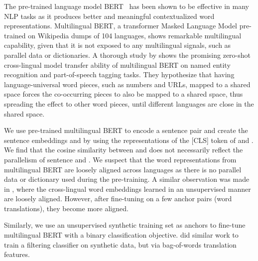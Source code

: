 \documentclass[11pt,a4paper]{article}
\begin{document}
The pre-trained language model BERT~\cite{devlin2018bert} has been shown to be effective in many NLP tasks as it produces better and meaningful contextualized word representations.  Multilingual BERT, a transformer Masked Language Model pre-trained on Wikipedia dumps of 104 languages, shows remarkable multilingual capability, given that it is not exposed to any multilingual signals, such as parallel data or dictionaries. A thorough study by \citet{pires2019multilingual} shows the promising zero-shot cross-lingual model transfer ability of multilingual BERT on named entity recognition and part-of-speech tagging tasks. They hypothesize that having language-universal word pieces, such as numbers and URLs, mapped to a shared space forces the co-occurring pieces to also be mapped to a shared space, thus spreading the effect to other word pieces, until different languages are close in the shared space.

We use pre-trained multilingual BERT to encode a sentence pair  and create the sentence embeddings  and  by using the representations of the [CLS] token of  and . We find that the cosine similarity between  and  does not necessarily reflect the parallelism of sentence  and . We suspect that the word representations from multilingual BERT are loosely aligned across languages as there is no parallel data or dictionary used during the pre-training. A similar observation was made in \citet{lample2017unsupervised}, where the cross-lingual word embeddings learned in an unsupervised manner are loosely aligned. However, after fine-tuning on a few anchor pairs (word translations), they become more aligned.

Similarly, we use an unsupervised synthetic training set as anchors to fine-tune multilingual BERT with a binary classification objective. \citet{xu2017zipporah} did similar work to train a filtering classifier on synthetic data, but via bag-of-words translation features.
\end{document}

